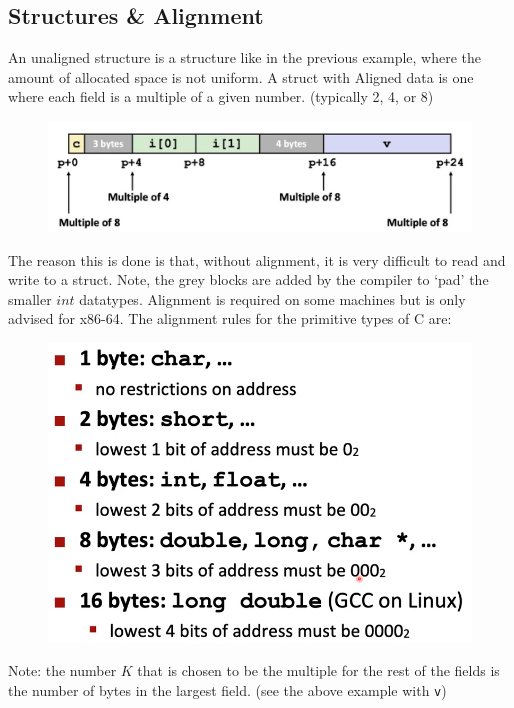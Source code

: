 \documentclass[12pt]{book}
\begin{document}
\subsection*{Structures \& Alignment}
An unaligned structure is a structure like in the previous example, where the 
amount of allocated space is not uniform. A struct with Aligned data is one where each
field is a multiple of a given number. (typically 2, 4, or 8)
\begin{figure}[h]
        \centering
        \includegraphics[scale = 0.4]{./figures/aligned}
\end{figure}

The reason this is done is that, without alignment, it is very difficult to read and write to
a struct. Note, the grey blocks are added by the compiler to `pad' the smaller $int$ datatypes.
Alignment is required on some machines but is only advised for x86-64.
The alignment rules for the primitive types of C are:
\begin{figure}[h]
        \centering
        \includegraphics[scale = 0.5]{./figures/alignTable}
\end{figure}

Note: the number $K$ that is chosen to be the multiple for the rest of the fields is the 
number of bytes in the largest field. (see the above example with  \texttt{v})
\end{document}

